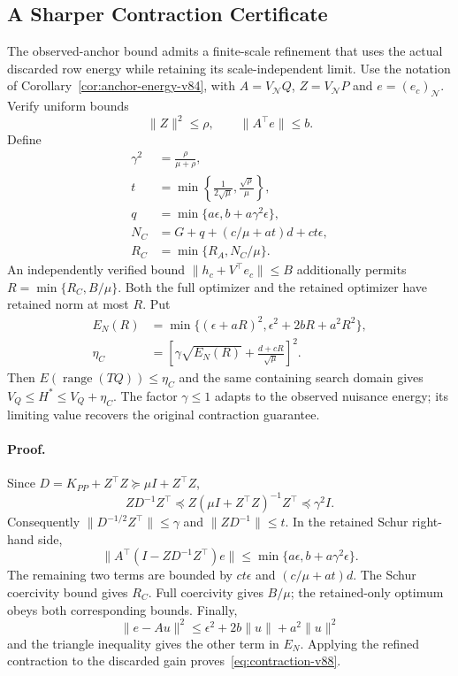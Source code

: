 \subsection{A Sharper Contraction Certificate}\label{app:contraction-v88}
The observed-anchor bound admits a finite-scale refinement that uses the actual discarded row energy while retaining its scale-independent limit. Use the notation of Corollary~\ref{cor:anchor-energy-v84}, with $A=V_{\mathcal N}Q$, $Z=V_{\mathcal N}P$ and $e=(e_c)_{\mathcal N}$. Verify uniform bounds
\[
 \|Z\|^2\le\rho,\qquad \|A^\top e\|\le b.
\]
Define
\begin{align*}
 \gamma^2&=\frac{\rho}{\mu+\rho},\\
 t&=\min\left\{\frac1{2\sqrt\mu},\frac{\sqrt\rho}{\mu}\right\},\\
 q&=\min\{a\epsilon,b+a\gamma^2\epsilon\},\\
 N_C&=G+q+(c/\mu+at)d+ct\epsilon,\\
 R_C&=\min\{R_A,N_C/\mu\}.
\end{align*}
An independently verified bound $\|h_c+V^\top e_c\|\le B$ additionally permits $R=\min\{R_C,B/\mu\}$. Both the full optimizer and the retained optimizer have retained norm at most $R$. Put
\begin{align}
 E_N(R)&=\min\{(\epsilon+aR)^2,\epsilon^2+2bR+a^2R^2\},\nonumber\\
 \eta_C&=\left[\gamma\sqrt{E_N(R)}+\frac{d+cR}{\sqrt\mu}\right]^2.\label{eq:contraction-v88}
\end{align}
Then $E(\operatorname{range}(TQ))\le\eta_C$ and the same containing search domain gives $V_Q\le H^*\le V_Q+\eta_C$. The factor $\gamma\le1$ adapts to the observed nuisance energy; its limiting value recovers the original contraction guarantee.

\paragraph{Proof.}
Since $D=K_{PP}+Z^\top Z\succeq\mu I+Z^\top Z$,
\[
 ZD^{-1}Z^\top\preceq Z(\mu I+Z^\top Z)^{-1}Z^\top\preceq\gamma^2I.
\]
Consequently $\|D^{-1/2}Z^\top\|\le\gamma$ and $\|ZD^{-1}\|\le t$. In the retained Schur right-hand side,
\[
 \|A^\top(I-ZD^{-1}Z^\top)e\|\le\min\{a\epsilon,b+a\gamma^2\epsilon\}.
\]
The remaining two terms are bounded by $ct\epsilon$ and $(c/\mu+at)d$. The Schur coercivity bound gives $R_C$. Full coercivity gives $B/\mu$; the retained-only optimum obeys both corresponding bounds. Finally,
\[
 \|e-Au\|^2\le\epsilon^2+2b\|u\|+a^2\|u\|^2
\]
and the triangle inequality gives the other term in $E_N$. Applying the refined contraction to the discarded gain proves~\eqref{eq:contraction-v88}.

